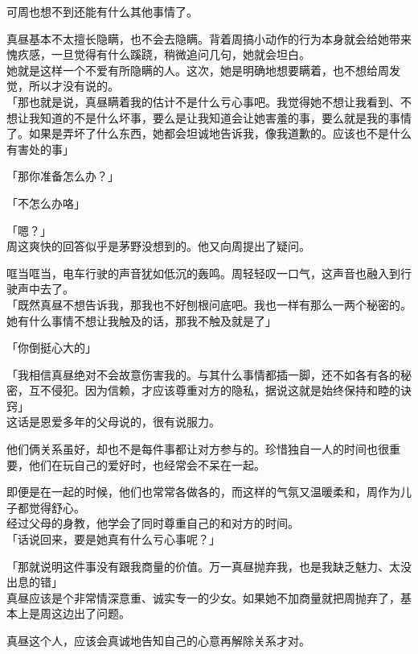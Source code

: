 可周也想不到还能有什么其他事情了。

真昼基本不太擅长隐瞒，也不会去隐瞒。背着周搞小动作的行为本身就会给她带来愧疚感，一旦觉得有什么蹊跷，稍微追问几句，她就会坦白。\\

她就是这样一个不爱有所隐瞒的人。这次，她是明确地想要瞒着，也不想给周发觉，所以才没有说的。\\

「那也就是说，真昼瞒着我的估计不是什么亏心事吧。我觉得她不想让我看到、不想让我知道的不是什么坏事，要么是让我知道会让她害羞的事，要么就是我的事情了。如果是弄坏了什么东西，她都会坦诚地告诉我，像我道歉的。应该也不是什么有害处的事」

「那你准备怎么办？」

「不怎么办咯」

「嗯？」\\

周这爽快的回答似乎是茅野没想到的。他又向周提出了疑问。

哐当哐当，电车行驶的声音犹如低沉的轰鸣。周轻轻叹一口气，这声音也融入到行驶声中去了。\\

「既然真昼不想告诉我，那我也不好刨根问底吧。我也一样有那么一两个秘密的。她有什么事情不想让我触及的话，那我不触及就是了」

「你倒挺心大的」

「我相信真昼绝对不会故意伤害我的。与其什么事情都插一脚，还不如各有各的秘密，互不侵犯。因为信赖，才应该尊重对方的隐私，据说这就是始终保持和睦的诀窍」\\

这话是恩爱多年的父母说的，很有说服力。

他们俩关系虽好，却也不是每件事都让对方参与的。珍惜独自一人的时间也很重要，他们在玩自己的爱好时，也经常会不呆在一起。

即便是在一起的时候，他们也常常各做各的，而这样的气氛又温暖柔和，周作为儿子都觉得舒心。\\

经过父母的身教，他学会了同时尊重自己的和对方的时间。\\

「话说回来，要是她真有什么亏心事呢？」

「那就说明这件事没有跟我商量的价值。万一真昼抛弃我，也是我缺乏魅力、太没出息的错」\\

真昼应该是个非常情深意重、诚实专一的少女。如果她不加商量就把周抛弃了，基本上是周这边出了问题。

真昼这个人，应该会真诚地告知自己的心意再解除关系才对。\\


